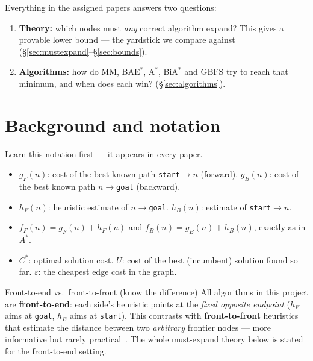 \documentclass[11pt]{article}
\newcommand{\gF}{g_F}
\newcommand{\gB}{g_B}
\newcommand{\hF}{h_F}
\newcommand{\hB}{h_B}
\newcommand{\fF}{f_F}
\newcommand{\fB}{f_B}
\newcommand{\Cstar}{C^{*}}
\begin{document}
Everything in the assigned papers answers two questions:
\begin{enumerate}[leftmargin=1.4em,itemsep=1pt]
  \item \textbf{Theory:} which nodes must \emph{any} correct algorithm expand? This gives a
        provable lower bound --- the yardstick we compare against
        (\S\ref{sec:mustexpand}--\S\ref{sec:bounds}).
  \item \textbf{Algorithms:} how do MM, BAE$^{*}$, A$^{*}$, BiA$^{*}$ and GBFS try to reach
        that minimum, and when does each win? (\S\ref{sec:algorithms}).
\end{enumerate}

\section{Background and notation}
\label{sec:notation}

Learn this notation first --- it appears in every paper.
\begin{itemize}[leftmargin=1.4em,itemsep=2pt]
  \item $\gF(n)$: cost of the best known path \texttt{start}$\to n$ (forward).
        $\gB(n)$: cost of the best known path $n\to$\texttt{goal} (backward).
  \item $\hF(n)$: heuristic estimate of $n\to$\texttt{goal}.
        $\hB(n)$: estimate of \texttt{start}$\to n$.
  \item $\fF(n)=\gF(n)+\hF(n)$ and $\fB(n)=\gB(n)+\hB(n)$, exactly as in $A^{*}$.
  \item $\Cstar$: optimal solution cost. $U$: cost of the best (incumbent) solution found so
        far. $\varepsilon$: the cheapest edge cost in the graph.
\end{itemize}

\begin{keybox}{Front-to-end vs.\ front-to-front (know the difference)}
All algorithms in this project are \textbf{front-to-end}: each side's heuristic points at
the \emph{fixed opposite endpoint} ($\hF$ aims at \texttt{goal}, $\hB$ aims at
\texttt{start}). This contrasts with \textbf{front-to-front} heuristics that estimate the
distance between two \emph{arbitrary} frontier nodes --- more informative but rarely
practical~\citep{eckerle2017sufficient}. The whole must-expand theory below is stated for
the front-to-end setting.
\end{keybox}
\end{document}
